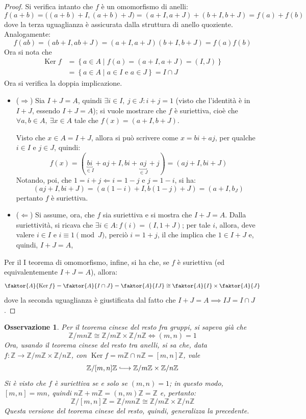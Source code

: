 \documentclass[12pt]{scrartcl}
\theoremstyle{style}
\newtheorem{osservazione}{Osservazione}[section]
\numberwithin{equation}{subsection}
\newcommand{\longhookrightarrow}{\lhook\joinrel\longrightarrow}
\begin{document}
	\begin{proof}
		Si verifica intanto che $f$ \`e un omomorfismo di anelli:
		\[
		f(a+b) = \big((a+b) +I, (a+b) + J\big) = (a+I,a+J) + (b+I,b+J) = f(a)+f(b)
		\] 
		dove la terza uguaglianza \`e assicurata dalla struttura di anello quoziente. 
		Analogamente:
		\[
		f(ab) = (ab + I, ab+ J)  = (a+I,a+J)(b+I,b+J) = f(a)f(b)
		\] 
	Ora si nota che 
	\[
		\begin{split}
			\operatorname{Ker} f&=\left\{ a \in A  \mid f(a) = (a+I,a+J) = (I,J) \right\} \\
					    &=\left\{ a \in A  \mid a \in I\text{ e } a \in J \right\} = I\cap J
		\end{split}
	\] 
	Ora si verifica la doppia implicazione.
	\begin{itemize}
		\item ($\Rightarrow $) Sia $I+J = A$, quindi $\exists i\in I, \ j \in J : i+j = 1$ (visto che l'identit\`a \`e in $I+J$, essendo $I+J=A$); si vuole mostrare che $f$ \`e suriettiva, cio\`e che $\forall a,b \in A, \ \exists x \in A $ tale che $f(x) = (a+I,b+J)$.

			Visto che $x \in A= I+J$, allora si pu\`o scrivere come $x = bi + aj$, per qualche $i \in I$ e $j\in J$, quindi:
			\[
				f(x) = (\underbracket{bi}_{\in I}  + aj + I, bi+ \underbracket{aj}_{\in J}  + j) = (aj+I,bi+J)
			\] 
			Notando, poi, che $1 = i + j\Leftarrow i= 1-j$ e $j=1-i$, si ha:
			\[
				(aj +I , bi+J) = (a(1-i) + I, b(1-j) + J) = (a+I,b_J)
			\] 
			pertanto $f$ \`e suriettiva.
		\item ($\Leftarrow $) Si assume, ora, che $f$ sia suriettiva e si mostra che $I+J = A$.
			Dalla suriettivit\`a, si ricava che $\exists i \in A : f(i) = (I,1+J)$; per tale $i$, allora, deve valere $i \in I$ e $i\equiv 1 \pmod{J} $, perci\`o $i = 1+j$, il che implica che $1 \in I+J$ e, quindi, $I+J=A$,
	\end{itemize}
	Per il I teorema di omomorfismo, infine, si ha che, se $f$ \`e suriettiva (ed equivalentemente $I+J = A$), allora:
	\[
		\faktor{A}{\operatorname{Ker} f}=\faktor{A}{I\cap J}=\faktor{A}{I J}\cong \faktor{A}{I} \times \faktor{A}{J}
	\] 
	dove la seconda uguaglianza \`e giustificata dal fatto che $I+J = A \implies IJ = I\cap J$.
	\end{proof}
\begin{osservazione}
Per il teorema cinese del resto fra gruppi, si sapeva gi\`a che 
\[
\mathbb{Z}/mn\mathbb{Z} \cong \mathbb{Z} / m\mathbb{Z}\times \mathbb{Z}/n\mathbb{Z} \iff (m,n) = 1
\] 
Ora, usando il teorema cinese del resto tra anelli, si sa che, data $f:\mathbb{Z}\longrightarrow \mathbb{Z}/ m \mathbb{Z} \times  \mathbb{Z}/ n \mathbb{Z}$, con $\operatorname{Ker} f = m\mathbb{Z} \cap n \mathbb{Z} = [m,n]\mathbb{Z}$, vale
\[
	\mathbb{Z}/[m,n]\mathbb{Z}\longhookrightarrow \mathbb{Z}/ m\mathbb{Z}\times \mathbb{Z}/n\mathbb{Z}
\] 
Si \`e visto che $f$ \`e suriettiva se e solo se $(m,n) = 1$; in questo modo, $[m,n] = mn$, quindi $n\mathbb{Z}+m\mathbb{Z}= (n,m)\mathbb{Z}=\mathbb{Z}$ e, pertanto:
\[
	\mathbb{Z}/ [m,n]\mathbb{Z}= \mathbb{Z}/ mn\mathbb{Z}\cong \mathbb{Z}/ m\mathbb{Z}\times \mathbb{Z}/n\mathbb{Z}
\] 
Questa versione del teorema cinese del resto, quindi, generalizza la precedente.
\end{osservazione}
\end{document}
